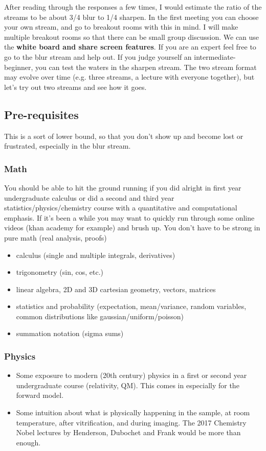 \documentclass[11pt, oneside]{article}   	%
\begin{document}
After reading through the responses a few times, I would estimate the ratio of the streams to be about 3/4 blur to 1/4 sharpen. In the first meeting you can choose your own stream, and go to breakout rooms with this in mind. I will make multiple breakout rooms so that there can be small group discussion. We can use the {\bf white board and share screen features}. If you are an expert feel free to go to the blur stream and help out. If you judge yourself an intermediate-beginner, you can test the waters in the sharpen stream. The two stream format may evolve over time (e.g. three streams, a lecture with everyone together), but let's try out two streams and see how it goes.

\subsection{Pre-requisites}
This is a sort of lower bound, so that you don't show up and become lost or frustrated, especially in the blur stream.

\subsubsection{Math}
You should be able to hit the ground running if you did alright in first year undergraduate calculus or did a second and third year statistics/physics/chemistry course with a quantitative and computational emphasis. If it's been a while you may want to quickly run through some online videos (khan academy for example) and brush up. You don't have to be strong in pure math (real analysis, proofs)
\begin{itemize}
	\item calculus (single and multiple integrals, derivatives)
	\item trigonometry (sin, cos, etc.)
	\item linear algebra, 2D and 3D cartesian geometry, vectors, matrices
	\item statistics and probability (expectation, mean/variance, random variables, common distributions like gaussian/uniform/poisson)
	\item summation notation (sigma sums)
\end{itemize}

\subsubsection{Physics}
\begin{itemize}
	\item Some exposure to modern (20th century) physics in a first or second year undergraduate course (relativity, QM). This comes in especially for the forward model.
	\item Some intuition about what is physically happening in the sample, at room temperature, after vitrification, and during imaging. The 2017 Chemistry Nobel lectures by Henderson, Dubochet and Frank would be more than enough.
\end{itemize}
\end{document}
